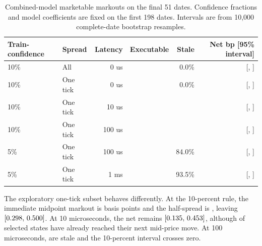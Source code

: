 \documentclass[11pt,a4paper]{article}
\begin{document}
\begin{table}[H]
  \centering
  \caption{Combined-model marketable markouts on the final 51 dates. Confidence
  fractions and model coefficients are fixed on the first 198 dates. Intervals
  are from 10,000 complete-date bootstrap resamples.}
  \label{tab:markouts}
  \small
  \begin{tabular}{llrrrr}
    \toprule
    Train-confidence & Spread & Latency & Executable & Stale & Net bp [95\% interval] \\
    \midrule
    10\% & All & 0 us & \MarkoutAllSignals{} & 0.0\% &
      \MarkoutAllZeroNet{} [\MarkoutAllZeroLower{}, \MarkoutAllZeroUpper{}] \\
    10\% & One tick & 0 us & \MarkoutOneTickSignals{} & 0.0\% &
      \MarkoutOneTickZeroNet{} [\MarkoutOneTickZeroLower{}, \MarkoutOneTickZeroUpper{}] \\
    10\% & One tick & 10 us & \MarkoutOneTickTenExecutable{} &
      \MarkoutOneTickTenStale{} &
      \MarkoutOneTickTenNet{} [\MarkoutOneTickTenLower{}, \MarkoutOneTickTenUpper{}] \\
    10\% & One tick & 100 us & \MarkoutOneTickHundredExecutable{} &
      \MarkoutOneTickHundredStale{} &
      \MarkoutOneTickHundredNet{} [\MarkoutOneTickHundredLower{}, \MarkoutOneTickHundredUpper{}] \\
    5\% & One tick & 100 us & \MarkoutTailHundredExecutable{} & 84.0\% &
      \MarkoutTailHundredNet{} [\MarkoutTailHundredLower{}, \MarkoutTailHundredUpper{}] \\
    5\% & One tick & 1 ms & \MarkoutTailThousandExecutable{} & 93.5\% &
      \MarkoutTailThousandNet{} [\MarkoutTailThousandLower{}, \MarkoutTailThousandUpper{}] \\
    \bottomrule
  \end{tabular}
\end{table}

The exploratory one-tick subset behaves differently. At the 10-percent rule,
the immediate midpoint markout is \MarkoutOneTickZeroGross{} basis points and
the half-spread is \MarkoutOneTickZeroSpread{}, leaving
\MarkoutOneTickZeroNet{}
$[0.298{},\,0.500{}]$. At 10
microseconds, the net remains \MarkoutOneTickTenNet{}
$[0.135{},\,0.453{}]$, although
\MarkoutOneTickTenStale{} of selected states have already reached their next
mid-price move. At 100 microseconds, \MarkoutOneTickHundredStale{} are stale and
the 10-percent interval crosses zero.
\end{document}
